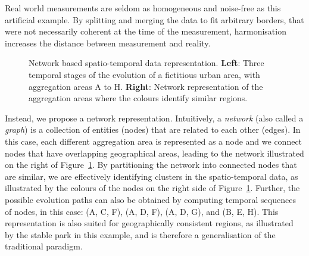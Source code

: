 Real world measurements are seldom as homogeneous and noise-free as this
artificial example. By splitting and merging the data to fit arbitrary borders,
that were not necessarily coherent at the time of the measurement, harmonisation
increases the distance between measurement and reality.


\begin{figure}
    \centering 
     \caption{Network based spatio-temporal data representation. \textbf{Left}:
    Three temporal stages of the evolution of a fictitious urban area, with
    aggregation areas A to H. \textbf{Right}: Network representation of the
    aggregation areas where the colours identify similar regions.
        \label{fig:intuition}}
\end{figure}

Instead, we propose a network representation. Intuitively, a \emph{network}
(also called a \emph{graph}) is a collection of entities (nodes) that are
related to each other (edges). In this case, each different aggregation area is
represented as a node and we connect nodes that have overlapping geographical
areas, leading to the network illustrated on the right of
Figure~\ref{fig:intuition}. By partitioning the network into connected nodes
that are similar, we are effectively identifying clusters in the spatio-temporal
data, as illustrated by the colours of the nodes on the right side of
Figure~\ref{fig:intuition}. Further, the possible evolution paths can also be
obtained by computing temporal sequences of nodes, in this case: (A, C, F), (A,
D, F), (A, D, G), and (B, E, H). This representation is also suited for
geographically consistent regions, as illustrated by the stable park in this
example, and is therefore a generalisation of the traditional paradigm.

